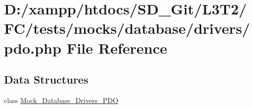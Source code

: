 \hypertarget{tests_2mocks_2database_2drivers_2pdo_8php}{}\section{D\+:/xampp/htdocs/\+S\+D\+\_\+\+Git/\+L3\+T2/\+F\+C/tests/mocks/database/drivers/pdo.php File Reference}
\label{tests_2mocks_2database_2drivers_2pdo_8php}
\subsection*{Data Structures}
\begin{DoxyCompactItemize}
\item 
class \hyperlink{class_mock___database___drivers___p_d_o}{Mock\+\_\+\+Database\+\_\+\+Drivers\+\_\+\+P\+D\+O}
\end{DoxyCompactItemize}
